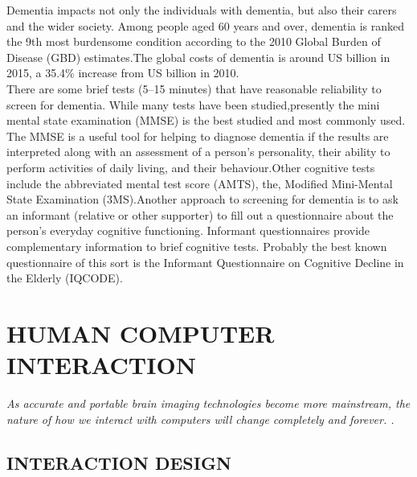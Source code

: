 Dementia impacts not only the individuals with dementia, but also their carers and the wider society. Among people aged 60 years and over, dementia is ranked the 9th most burdensome condition according to the 2010 Global Burden of Disease (GBD) estimates.The global costs of dementia is around US   billion in 2015, a 35.4\% increase from US  billion in 2010.\\There are some brief tests (5–15 minutes) that have reasonable reliability to screen for dementia. While many tests have been studied,presently the mini mental state examination (MMSE) is the best studied and most commonly used. The MMSE is a useful tool for helping to diagnose dementia if the results are interpreted along with an assessment of a person's personality, their ability to perform activities of daily living, and their behaviour.Other cognitive tests include the abbreviated mental test score (AMTS), the, Modified Mini-Mental State Examination (3MS).Another approach to screening for dementia is to ask an informant (relative or other supporter) to fill out a questionnaire about the person's everyday cognitive functioning. Informant questionnaires provide complementary information to brief cognitive tests. Probably the best known questionnaire of this sort is the Informant Questionnaire on Cognitive Decline in the Elderly (IQCODE).



\chapter{HUMAN COMPUTER INTERACTION}


{\em As accurate and portable brain imaging technologies become more mainstream, the nature of how we interact with computers will change completely and forever. . }

\section{INTERACTION DESIGN}

